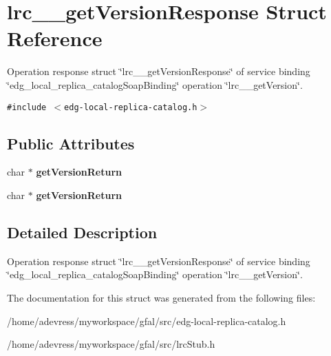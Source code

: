 \section{lrc\_\-\_\-get\-Version\-Response Struct Reference}
\label{structlrc____getVersionResponse}
Operation response struct \char`\"{}lrc\_\-\_\-get\-Version\-Response\char`\"{} of service binding \char`\"{}edg\_\-local\_\-replica\_\-catalog\-Soap\-Binding\char`\"{} operation \char`\"{}lrc\_\-\_\-get\-Version\char`\"{}.  


{\tt \#include $<$edg-local-replica-catalog.h$>$}

\subsection*{Public Attributes}
\begin{CompactItemize}
\item 
char $\ast$ \textbf{get\-Version\-Return}\label{structlrc____getVersionResponse_112065e209a2d1242342fc273190cdc1}

\item 
char $\ast$ \textbf{get\-Version\-Return}\label{structlrc____getVersionResponse_112065e209a2d1242342fc273190cdc1}

\end{CompactItemize}


\subsection{Detailed Description}
Operation response struct \char`\"{}lrc\_\-\_\-get\-Version\-Response\char`\"{} of service binding \char`\"{}edg\_\-local\_\-replica\_\-catalog\-Soap\-Binding\char`\"{} operation \char`\"{}lrc\_\-\_\-get\-Version\char`\"{}. 



The documentation for this struct was generated from the following files:\begin{CompactItemize}
\item 
/home/adevress/myworkspace/gfal/src/edg-local-replica-catalog.h\item 
/home/adevress/myworkspace/gfal/src/lrc\-Stub.h\end{CompactItemize}
